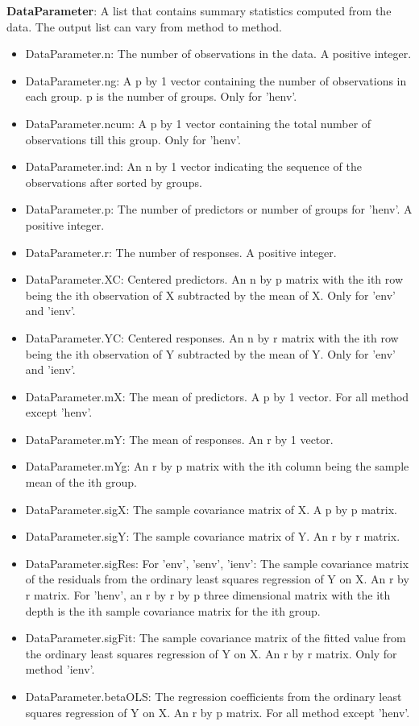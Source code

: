 \documentclass[a4paper,11pt,openany]{memoir}
\begin{document}
\begin{par}
\textbf{DataParameter}: A list that contains summary statistics computed from the data.  The output list can vary from method to method.
\end{par} \vspace{1em}
\begin{itemize}
\setlength{\itemsep}{-1ex}
   \item DataParameter.n: The number of observations in the data.  A positive integer.
   \item DataParameter.ng: A p by 1 vector containing the number of observations in each group.  p is the number of groups.  Only for 'henv'.
   \item DataParameter.ncum: A p by 1 vector containing the total number of observations till this group.  Only for 'henv'.
   \item DataParameter.ind: An n by 1 vector indicating the sequence of the observations after sorted by groups.
   \item DataParameter.p: The number of predictors or number of groups for 'henv'.  A positive integer.
   \item DataParameter.r: The number of responses.  A positive integer.
   \item DataParameter.XC: Centered predictors.  An n by p matrix with the ith row being the ith observation of X subtracted by the mean of X.  Only for 'env' and 'ienv'.
   \item DataParameter.YC: Centered responses.  An n by r matrix with the ith row being the ith observation of Y subtracted by the mean of Y.  Only for 'env' and 'ienv'.
   \item DataParameter.mX: The mean of predictors.  A p by 1 vector.  For all method except 'henv'.
   \item DataParameter.mY: The mean of responses.  An r by 1 vector.
   \item DataParameter.mYg: An r by p matrix with the ith column being the sample mean of the ith group.
   \item DataParameter.sigX: The sample covariance matrix of X.  A p by p matrix.
   \item DataParameter.sigY: The sample covariance matrix of Y.  An r by r matrix.
   \item DataParameter.sigRes: For 'env', 'senv', 'ienv': The sample covariance matrix of the residuals from the ordinary least squares regression of Y on X.  An r by r matrix. For 'henv', an r by r by p three dimensional matrix with the ith depth is the ith sample covariance matrix for the ith group.
   \item DataParameter.sigFit: The sample covariance matrix of the fitted value from the ordinary least squares regression of Y on X.  An r by r matrix. Only for method 'ienv'.
   \item DataParameter.betaOLS: The regression coefficients from the ordinary least squares regression of Y on X.  An r by p matrix.  For all method except 'henv'.
\end{itemize}
\end{document}
